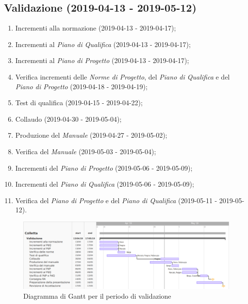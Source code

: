 	\newpage
	
	\subsection{Validazione (2019-04-13 - 2019-05-12)}
		\begin{enumerate}[label= 5.\arabic*)]
			\item Incrementi alla normazione (2019-04-13 - 2019-04-17);
			\item Incrementi al \textit{Piano di Qualifica} (2019-04-13 - 2019-04-17);
			\item Incrementi al \textit{Piano di Progetto} (2019-04-13 - 2019-04-17);
			\item Verifica incrementi delle \textit{Norme di Progetto}, del \textit{Piano di Qualifica} e del \textit{Piano di Progetto} (2019-04-18 - 2019-04-19);
			\item Test di qualifica (2019-04-15 - 2019-04-22);
			\item Collaudo (2019-04-30 - 2019-05-04);
			\item Produzione del \textit{Manuale} (2019-04-27 - 2019-05-02);
			\item Verifica del \textit{Manuale} (2019-05-03 - 2019-05-04);
			\item Incrementi del \textit{Piano di Progetto} (2019-05-06 - 2019-05-09);
			\item Incrementi del \textit{Piano di Qualifica} (2019-05-06 - 2019-05-09);
			\item Verifica del \textit{Piano di Progetto} e del \textit{Piano di Qualifica} (2019-05-11 - 2019-05-12).
		\end{enumerate}

		\begin{figure}[!hbtp]
		\centering
		\includegraphics[scale=0.5, angle=90]{images/ganttval.png}
		\caption{Diagramma di Gantt per il periodo di validazione}
	\end{figure}
		\newpage